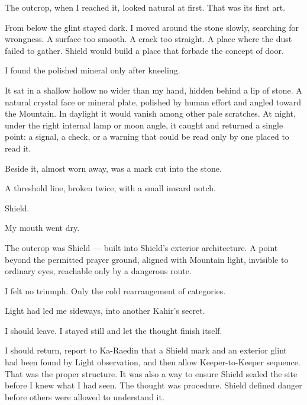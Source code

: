 The outcrop, when I reached it, looked natural at first. That was its first art.\par

From below the glint stayed dark. I moved around the stone slowly, searching for wrongness. A surface too smooth. A crack too straight. A place where the dust failed to gather. Shield would build a place that forbade the concept of door.\par

I found the polished mineral only after kneeling.\par

It sat in a shallow hollow no wider than my hand, hidden behind a lip of stone. A natural crystal face or mineral plate, polished by human effort and angled toward the Mountain. In daylight it would vanish among other pale scratches. At night, under the right internal lamp or moon angle, it caught and returned a single point: a signal, a check, or a warning that could be read only by one placed to read it.\par

Beside it, almost worn away, was a mark cut into the stone.\par

A threshold line, broken twice, with a small inward notch.\par

Shield.\par

My mouth went dry.\par

The outcrop was Shield --- built into Shield's exterior architecture. A point beyond the permitted prayer ground, aligned with Mountain light, invisible to ordinary eyes, reachable only by a dangerous route.\par

I felt no triumph. Only the cold rearrangement of categories.\par

Light had led me sideways, into another Kahir's secret.\par

I should leave. I stayed still and let the thought finish itself.\par

I should return, report to Ka-Raedin that a Shield mark and an exterior glint had been found by Light observation, and then allow Keeper-to-Keeper sequence. That was the proper structure. It was also a way to ensure Shield sealed the site before I knew what I had seen. The thought was procedure. Shield defined danger before others were allowed to understand it.\par

